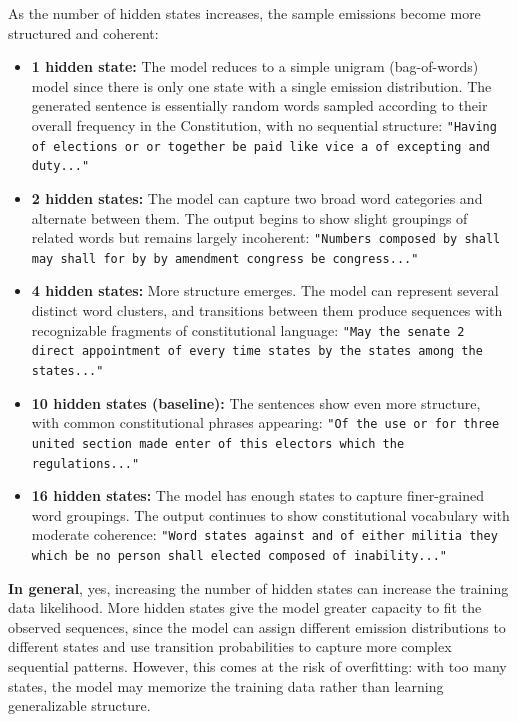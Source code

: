 \documentclass{article}
\begin{document}
\begin{subsolution}

As the number of hidden states increases, the sample emissions become more structured and coherent:

\begin{itemize}
    \item \textbf{1 hidden state:} The model reduces to a simple unigram (bag-of-words) model since there is only one state with a single emission distribution. The generated sentence is essentially random words sampled according to their overall frequency in the Constitution, with no sequential structure: \texttt{"Having of elections or or together be paid like vice a of excepting and duty..."}

    \item \textbf{2 hidden states:} The model can capture two broad word categories and alternate between them. The output begins to show slight groupings of related words but remains largely incoherent: \texttt{"Numbers composed by shall may shall for by by amendment congress be congress..."}

    \item \textbf{4 hidden states:} More structure emerges. The model can represent several distinct word clusters, and transitions between them produce sequences with recognizable fragments of constitutional language: \texttt{"May the senate 2 direct appointment of every time states by the states among the states..."}

    \item \textbf{10 hidden states (baseline):} The sentences show even more structure, with common constitutional phrases appearing: \texttt{"Of the use or for three united section made enter of this electors which the regulations..."}

    \item \textbf{16 hidden states:} The model has enough states to capture finer-grained word groupings. The output continues to show constitutional vocabulary with moderate coherence: \texttt{"Word states against and of either militia they which be no person shall elected composed of inability..."}
\end{itemize}

\textbf{In general}, yes, increasing the number of hidden states can increase
 the training data likelihood. More hidden states give the model greater
  capacity to fit the observed sequences, since the model can assign 
  different emission distributions to different states and use
   transition probabilities to capture more complex sequential
    patterns. However, this comes at the risk of overfitting: 
    with too many states, the model may memorize the training 
    data rather than learning generalizable structure.

\end{subsolution}
\newpage
\end{document}
